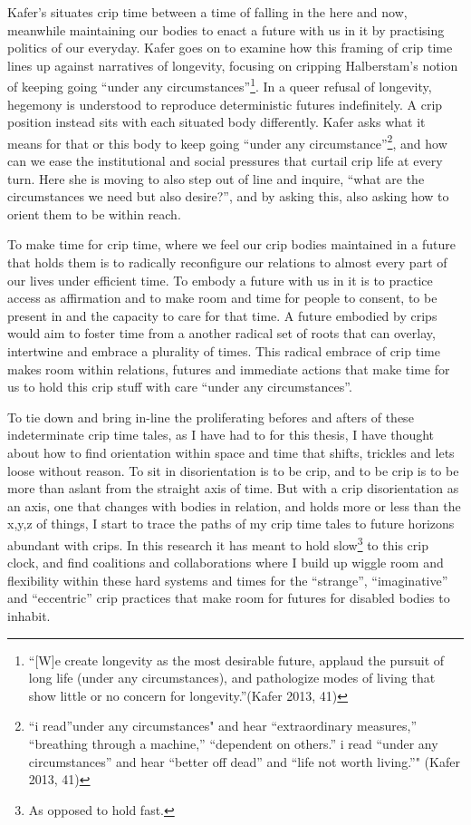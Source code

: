 Kafer's situates crip time between a time of falling in the here and
now, meanwhile maintaining our bodies to enact a future with us in it by
practising politics of our everyday. Kafer goes on to examine how this
framing of crip time lines up against narratives of longevity, focusing
on cripping Halberstam's notion of keeping going ``under any
circumstances''\footnote{``{[}W{]}e create longevity as the most
  desirable future, applaud the pursuit of long life (under any
  circumstances), and pathologize modes of living that show little or no
  concern for longevity.''(Kafer 2013, 41)}. In a queer refusal of
longevity, hegemony is understood to reproduce deterministic futures
indefinitely. A crip position instead sits with each situated body
differently. Kafer asks what it means for that or this body to keep
going ``under any circumstance''\footnote{``i read''under any
  circumstances" and hear ``extraordinary measures,'' ``breathing
  through a machine,'' ``dependent on others.'' i read ``under any
  circumstances'' and hear ``better off dead'' and ``life not worth
  living.''" (Kafer 2013, 41)}, and how can we ease the institutional
and social pressures that curtail crip life at every turn. Here she is
moving to also step out of line and inquire, ``what are the
circumstances we need but also desire?'', and by asking this, also
asking how to orient them to be within reach.

To make time for crip time, where we feel our crip bodies maintained in
a future that holds them is to radically reconfigure our relations to
almost every part of our lives under efficient time. To embody a future
with us in it is to practice access as affirmation and to make room and
time for people to consent, to be present in and the capacity to care
for that time. A future embodied by crips would aim to foster time from
a another radical set of roots that can overlay, intertwine and embrace
a plurality of times. This radical embrace of crip time makes room
within relations, futures and immediate actions that make time for us to
hold this crip stuff with care ``under any circumstances''.

To tie down and bring in-line the proliferating befores and afters of
these indeterminate crip time tales, as I have had to for this thesis, I
have thought about how to find orientation within space and time that
shifts, trickles and lets loose without reason. To sit in disorientation
is to be crip, and to be crip is to be more than aslant from the
straight axis of time. But with a crip disorientation as an axis, one
that changes with bodies in relation, and holds more or less than the
x,y,z of things, I start to trace the paths of my crip time tales to
future horizons abundant with crips. In this research it has meant to
hold slow\footnote{As opposed to hold fast.} to this crip clock, and
find coalitions and collaborations where I build up wiggle room and
flexibility within these hard systems and times for the ``strange'',
``imaginative'' and ``eccentric'' crip practices that make room for
futures for disabled bodies to inhabit.

